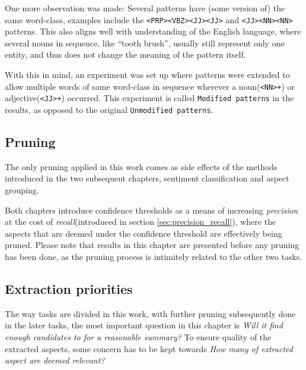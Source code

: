 \documentclass[a4paper,11pt]{kth-mag}
\begin{document}
One more observation was made: Several patterns have (some version of) the same word-class,
examples include the \texttt{<PRP><VBZ><JJ><JJ>} and \texttt{<JJ><NN><NN>} patterns.
This also aligns well with understanding of the English language, where several nouns in sequence,
like ``tooth brush'', usually still represent only one entity, and thus does not change
the meaning of the pattern itself.

With this in mind, an experiment was set up where patterns were extended to allow
multiple words of same word-class in sequence wherever a noun(\texttt{<NN>+})
or adjective(\texttt{<JJ>+}) occurred.
This experiment is called \texttt{Modified patterns} in the results, as opposed to
the original \texttt{Unmodified patterns}.


\subsection{Pruning}
\label{subsec:pruning}
The only pruning applied in this work comes as side effects of the methods introduced
in the two subsequent chapters, sentiment classification and aspect grouping.

Both chapters introduce confidence thresholds as a means of increasing
\emph{precision} at the cost of \emph{recall}(introduced in section \ref{sec:precision_recall}),
where the aspects that are deemed under the confidence threshold are effectively being pruned.
Please note that results in this chapter are presented
before any pruning has been done, as the pruning process is intimitely related
to the other two tasks.


\subsection{Extraction priorities}
The way tasks are divided in this work, with further pruning subsequently done in
the later tasks, the most important question in this chapter is
\emph{Will it find enough candidates to for a reasonable summary?}
To ensure quality of the extracted aspects, some concern has to be kept towards \emph{How many
  of extracted aspect are deemed relevant?}

%
\end{document}
